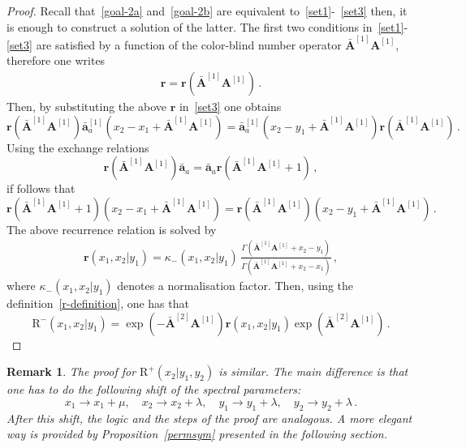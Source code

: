 \documentclass[11pt]{article}
\numberwithin{equation}{section}
\newtheorem{remark}[theorem]{Remark}
\newcommand{\oad}{\mathbf{\bar{a}}}
\newcommand{\OA}{\mathbf{A}}
\newcommand{\OAD}{\mathbf{\bar{A}}}
\newcommand{\abrOSCR}{\mathrm{R}}
\begin{document}
\begin{proof}
Recall that~\eqref{goal-2a} and~\eqref{goal-2b} are equivalent to~\eqref{set1}-~\eqref{set3} then, it is enough to construct a solution of the latter. The first two conditions in~\eqref{set1}-\eqref{set3} are satisfied by a function of the color-blind number operator $\OAD^{[1]}\OA^{[1]}$, therefore one writes
\begin{align}
	\mathbf{r}=\mathbf{r}(\OAD^{[1]}\OA^{[1]})\,.
\end{align}
Then, by substituting the above $\mathbf{r}$ in~\eqref{set3}  one obtains
\begin{equation}
	\mathbf{r}(\OAD^{[1]}\OA^{[1]}){\oad}_{a}^{[1]}(x_{2}-x_{1}+\OAD^{[1]}\OA^{[1]})={\oad}_{a}^{[1]}(x_{2}-y_{1}+\OAD^{[1]}\OA^{[1]})\mathbf{r}(\OAD^{[1]}\OA^{[1]})\,.
\end{equation}
Using the exchange relations
\begin{equation}
	\mathbf{r}(\OAD^{[1]}\OA^{[1]})\oad_{a}=\oad_{a}\mathbf{r}(\OAD^{[1]}\OA^{[1]}+1)\,,
\end{equation}
if follows that
\begin{equation}
	\mathbf{r}(\OAD^{[1]}\OA^{[1]}+1)(x_{2}-x_{1}+\OAD^{[1]}\OA^{[1]})=\mathbf{r}(\OAD^{[1]}\OA^{[1]})(x_{2}-y_{1}+\OAD^{[1]}\OA^{[1]})\,.
\end{equation}
The above recurrence relation is solved by
\begin{align}
	\mathbf{r}(x_{1},x_{2}|y_{1})=\kappa_-(x_{1},x_{2}|y_{1})\,\frac{\Gamma(\OAD^{[1]}\OA^{[1]}+x_{2}-y_{1})}{\Gamma(\OAD^{[1]}\OA^{[1]}+x_{2}-x_{1})}\,,
\end{align}
where $\kappa_-(x_{1},x_{2}|y_{1})$ denotes a normalisation factor.
Then, using the definition~\eqref{r-definition}, one has that
\begin{equation}
	\abrOSCR^{-}(x_{1},x_{2}|y_{1})=\exp{\left(-\OAD^{[2]}\OA^{[1]}\right)}\mathbf{r}(x_{1},x_{2}|y_{1})\exp{\left(\OAD^{[2]}\OA^{[1]}\right)}\,.
\end{equation}
\end{proof}



\begin{remark}\label{Remark-differnce-Rp-Rm-derivation}
    The proof for $\abrOSCR^{+}(x_{2}|y_{1},y_{2})$ is similar. The main difference is that one has to do the following shift of the spectral parameters:
    \begin{equation}
        x_{1}\to x_{1}+\mu,\quad x_{2}\to x_{2}+\lambda,\quad y_{1}\to y_{1}+\lambda,\quad y_{2}\to y_{2}+\lambda\,.
    \end{equation}
    After this shift, the logic and the steps of the proof are analogous. 
 A more elegant way  is provided by Proposition~\ref{permsym} presented in the following section.
\end{remark}
\end{document}

